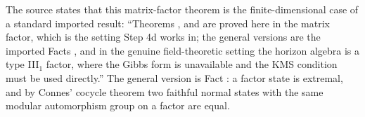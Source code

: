 The source states that this matrix-factor theorem is the finite-dimensional case of a standard imported result: ``Theorems ,  and  are proved here in the matrix factor, which is the setting Step 4d works in; the general versions are the imported Facts , and in the genuine field-theoretic setting the horizon algebra is a type III$_1$ factor, where the Gibbs form is unavailable and the KMS condition must be used directly.'' The general version is Fact : a factor state is extremal, and by Connes' cocycle theorem two faithful normal states with the same modular automorphism group on a factor are equal.
